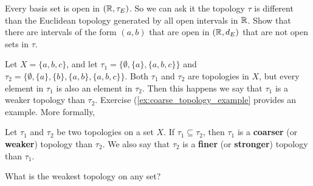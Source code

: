 	\item Every basis set is open in $(\mathbb{R}, \tau_E)$. So we can ask it the topology $\tau$ is different than the Euclidean topology generated by all open intervals in $\mathbb{R}$. Show that there are intervals of the form $(a,b)$ that are open in $(\mathbb{R}, d_E)$ that are not open sets in $\tau$.

	\ea

\begin{comment}

\ExerciseSolution

	\ba
	\item First, $0 \in (-1,1)$. If $x \in \R$ is not zero, then $n \in (-|x|+1, |x|+1)$. 
	
	Now suppose that $B_1$ and $B_2$ are basis sets and $x \in B_1 \cap B_2$. As basis sets, we know that $B_1 = (-r,r)$ and $B_2 = (-s,s)$ for some $r,s \in \R^+$. Without loss of generality, assume that $r \leq s$. Then $B_1 \subseteq B_2$ and $x \in B_1 = B_1 \cap B_2$. 
So $\B$ is a basis for a topology on $\r$.	

	\item We will show that the interval $(0,1)$ is not open in $(\R, \tau)$. Since every basis set has the form $(-z,z)$ for $z \in \R^+$, every basis set contains negative real numbers. So $(0,1)$ can't be a union of basis sets and $(0,1)$ is not open in $(\R, \tau)$.  
		
	\ea

\end{comment}


\item Let $X = \{a,b,c\}$, and let $\tau_1 = \{\emptyset, \{a\}, \{a,b,c\}\}$ and $\tau_2 = \{\emptyset, \{a\}, \{b\}, \{a,b\}, \{a,b,c\}\}$. Both $\tau_1$ and $\tau_2$ are topologies in $X$, but every element in $\tau_1$ is also an element in $\tau_2$. Then this happens we say that $\tau_1$ is a weaker topology than $\tau_2$. Exercise (\ref{ex:coarse_topology_example} provides an example. More formally,

\begin{definition} \label{def:weaker_topologies} Let $\tau_1$ and $\tau_2$ be two topologies on a set $X$. If $\tau_1 \subseteq \tau_2$, then $\tau_1$ is a \textbf{coarser} (or \textbf{weaker}) topology than $\tau_2$. We also say that $\tau_2$ is a \textbf{finer} (or \textbf{stronger}) topology than $\tau_1$. 
\end{definition}

\ba

\item What is the weakest topology on any set?

